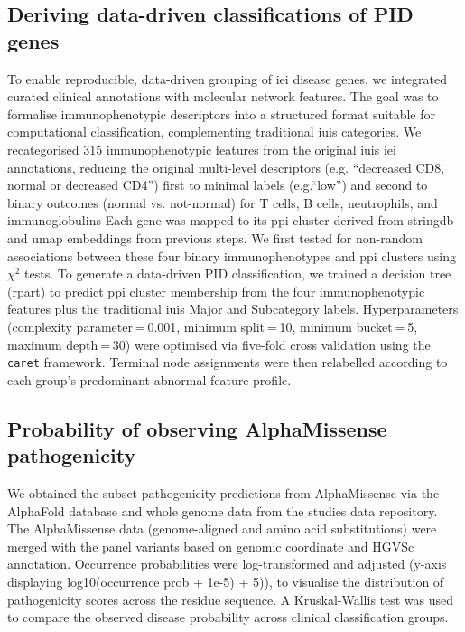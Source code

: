 \subsection{Deriving data-driven classifications of PID genes}
To enable reproducible, data-driven grouping of \ac{iei} disease genes, we integrated curated clinical annotations with molecular network features. The goal was to formalise immunophenotypic descriptors into a structured format suitable for computational classification, complementing traditional \ac{iuis} categories.
We recategorised 315 immunophenotypic features from the original \ac{iuis} \ac{iei} annotations, reducing the original multi-level descriptors (e.g. ``decreased CD8, normal or decreased CD4'') first to 
minimal labels (e.g.``low'') and second to binary outcomes (normal vs. not-normal) for T cells, B cells, neutrophils, and immunoglobulins %
Each gene was mapped to its \ac{ppi} cluster derived from \ac{stringdb} and \ac{umap} embeddings from previous steps. 
We first tested for non-random associations between these four binary immunophenotypes and \ac{ppi} clusters using $\chi^2$ tests. %
To generate a data-driven PID classification, we trained a decision tree (rpart) to predict \ac{ppi} cluster membership from the four immunophenotypic features plus the traditional \ac{iuis} Major and Subcategory labels. 
Hyperparameters (complexity parameter = 0.001, minimum split = 10, minimum bucket = 5, maximum depth = 30) were optimised via five-fold cross validation using the \texttt{caret} framework. 
Terminal node assignments were then relabelled according to each group’s predominant abnormal feature profile.

\subsection{Probability of observing AlphaMissense pathogenicity}
We obtained the subset pathogenicity predictions from AlphaMissense via the AlphaFold database and whole genome data from the studies data repository\cite{cheng_accurate_2023, jun_cheng_2023_8208688}. 
The AlphaMissense data (genome-aligned and amino acid substitutions) were merged with the panel variants based on genomic coordinate and HGVSc annotation. 
Occurrence probabilities were log-transformed and adjusted (y-axis displaying log10(occurrence prob + 1e-5) + 5)), to visualise the distribution of pathogenicity scores across the residue sequence. 
A Kruskal-Wallis test was used to compare the observed disease probability across clinical classification groups.

